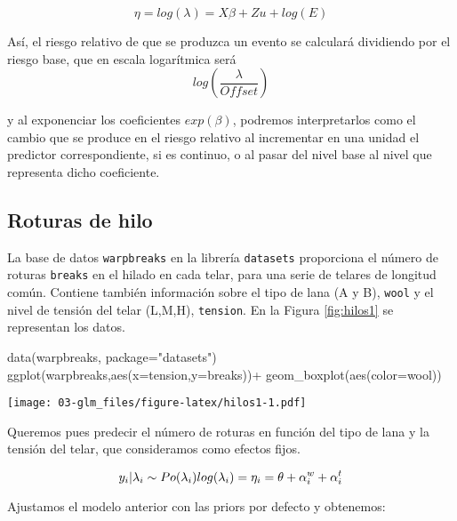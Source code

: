 \documentclass[
]{book}
\newenvironment{Shaded}{\begin{snugshade}}{\end{snugshade}}
\newcommand{\AttributeTok}[1]{\textcolor[rgb]{0.77,0.63,0.00}{#1}}
\newcommand{\FunctionTok}[1]{\textcolor[rgb]{0.00,0.00,0.00}{#1}}
\newcommand{\NormalTok}[1]{#1}
\newcommand{\SpecialCharTok}[1]{\textcolor[rgb]{0.00,0.00,0.00}{#1}}
\newcommand{\StringTok}[1]{\textcolor[rgb]{0.31,0.60,0.02}{#1}}
\begin{document}
\[\eta=log(\lambda)=X\beta+Zu+log(E)\]

Así, el riesgo relativo de que se produzca un evento se calculará dividiendo por el riesgo base, que en escala logarítmica será
\[log\left(\frac{\lambda}{Offset}\right)\]

y al exponenciar los coeficientes \(exp(\beta)\), podremos interpretarlos como el cambio que se produce en el riesgo relativo al incrementar en una unidad el predictor correspondiente, si es continuo, o al pasar del nivel base al nivel que representa dicho coeficiente.

\hypertarget{roturas-de-hilo}{%
\subsection{Roturas de hilo}\label{roturas-de-hilo}}

La base de datos \texttt{warpbreaks} en la librería \texttt{datasets} proporciona el número de roturas \texttt{breaks} en el hilado en cada telar, para una serie de telares de longitud común. Contiene también información sobre el tipo de lana (A y B), \texttt{wool} y el nivel de tensión del telar (L,M,H), \texttt{tension}. En la Figura \ref{fig:hilos1} se representan los datos.

\begin{Shaded}
\begin{Highlighting}[]
\FunctionTok{data}\NormalTok{(warpbreaks, }\AttributeTok{package=}\StringTok{"datasets"}\NormalTok{)}
\FunctionTok{ggplot}\NormalTok{(warpbreaks,}\FunctionTok{aes}\NormalTok{(}\AttributeTok{x=}\NormalTok{tension,}\AttributeTok{y=}\NormalTok{breaks))}\SpecialCharTok{+}
  \FunctionTok{geom\_boxplot}\NormalTok{(}\FunctionTok{aes}\NormalTok{(}\AttributeTok{color=}\NormalTok{wool))}
\end{Highlighting}
\end{Shaded}

\texttt{[image: 03-glm\_files/figure-latex/hilos1-1.pdf]}

Queremos pues predecir el número de roturas en función del tipo de lana y la tensión del telar, que consideramos como efectos fijos.

\[ y_i|\lambda_i \sim Po(\lambda_i) \\
log(\lambda_i)=\eta_i=\theta+ \alpha_i^w+ \alpha_i^t\]

Ajustamos el modelo anterior con las priors por defecto y obtenemos:
\end{document}
